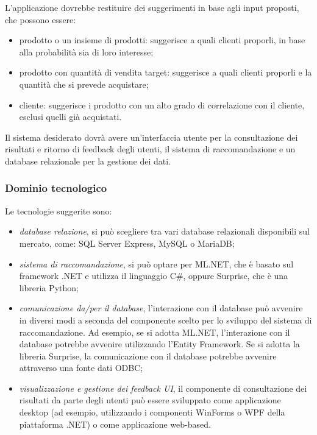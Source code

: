 		L'applicazione dovrebbe restituire dei suggerimenti in base agli input proposti, che possono essere:
		\begin{itemize}
			\item prodotto o un insieme di prodotti: suggerisce a quali clienti proporli, in base alla probabilità sia di loro interesse;
			\item prodotto con quantità di vendita target: suggerisce a quali clienti proporli e la quantità che si prevede acquistare;
			\item cliente: suggerisce i prodotto con un alto grado di correlazione con il cliente, esclusi quelli già acquistati.
		\end{itemize}
		Il sistema desiderato dovrà avere un'interfaccia utente per la consultazione dei risultati e ritorno di feedback degli utenti, il sistema di raccomandazione e un database relazionale per la gestione dei dati.
		
	\subsubsection{Dominio tecnologico}
		Le tecnologie suggerite sono:
		\begin{itemize}
			\item \emph{database relazione}, si può scegliere tra vari database relazionali disponibili sul mercato, come: SQL Server Express, MySQL o MariaDB;
			\item \emph{sistema di raccomandazione}, si può optare per ML.NET, che è basato sul framework .NET e utilizza il linguaggio C\#, oppure Surprise, che è una libreria Python;
			\item \emph{comunicazione da/per il database}, l'interazione con il database può avvenire in diversi modi a seconda del componente scelto per lo sviluppo del sistema di raccomandazione. Ad esempio, se si adotta ML.NET, l’interazione con il
			database potrebbe avvenire utilizzando l’Entity Framework. Se si adotta la libreria Surprise, la comunicazione con il database potrebbe avvenire attraverso una fonte dati ODBC;
			\item \emph{visualizzazione e gestione dei feedback UI}, il componente di consultazione
			dei risultati da parte degli utenti può essere sviluppato come applicazione
			desktop (ad esempio, utilizzando i componenti WinForms o WPF della
			piattaforma .NET) o come applicazione web-based.
		\end{itemize}
		
